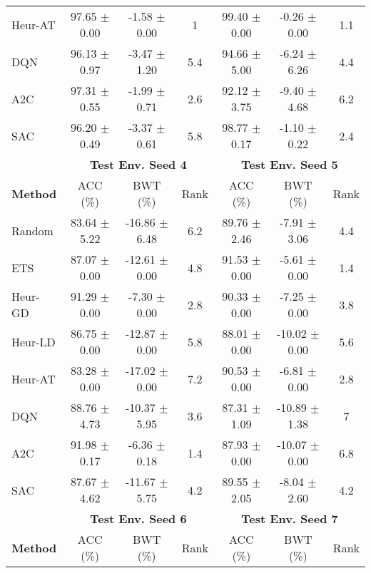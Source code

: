 \begin{tabular}{lcccccc}
	Heur-AT         & 97.65 $\pm$ 0.00   & -1.58 $\pm$ 0.00    & 1      & 99.40 $\pm$ 0.00   & -0.26 $\pm$ 0.00    & 1.1    \\
	DQN             & 96.13 $\pm$ 0.97   & -3.47 $\pm$ 1.20    & 5.4    & 94.66 $\pm$ 5.00   & -6.24 $\pm$ 6.26    & 4.4    \\
	A2C             & 97.31 $\pm$ 0.55   & -1.99 $\pm$ 0.71    & 2.6    & 92.12 $\pm$ 3.75   & -9.40 $\pm$ 4.68    & 6.2    \\
	SAC             & 96.20 $\pm$ 0.49   & -3.37 $\pm$ 0.61    & 5.8    & 98.77 $\pm$ 0.17   & -1.10 $\pm$ 0.22    & 2.4    \\
	\midrule 
	& \multicolumn{3}{c}{\textbf{Test Env. Seed 4}} & \multicolumn{3}{c}{\textbf{Test Env. Seed 5}} \\
	\cmidrule(lr){2-4} \cmidrule(lr){5-7}
	\textbf{Method} & ACC (\%)         & BWT (\%)          & Rank   & ACC (\%)         & BWT (\%)          & Rank   \\
	\midrule 
	Random          & 83.64 $\pm$ 5.22   & -16.86 $\pm$ 6.48   & 6.2    & 89.76 $\pm$ 2.46   & -7.91 $\pm$ 3.06    & 4.4    \\
	ETS             & 87.07 $\pm$ 0.00   & -12.61 $\pm$ 0.00   & 4.8    & 91.53 $\pm$ 0.00   & -5.61 $\pm$ 0.00    & 1.4    \\
	Heur-GD         & 91.29 $\pm$ 0.00   & -7.30 $\pm$ 0.00    & 2.8    & 90.33 $\pm$ 0.00   & -7.25 $\pm$ 0.00    & 3.8    \\
	Heur-LD         & 86.75 $\pm$ 0.00   & -12.87 $\pm$ 0.00   & 5.8    & 88.01 $\pm$ 0.00   & -10.02 $\pm$ 0.00   & 5.6    \\
	Heur-AT         & 83.28 $\pm$ 0.00   & -17.02 $\pm$ 0.00   & 7.2    & 90.53 $\pm$ 0.00   & -6.81 $\pm$ 0.00    & 2.8    \\
	DQN             & 88.76 $\pm$ 4.73   & -10.37 $\pm$ 5.95   & 3.6    & 87.31 $\pm$ 1.09   & -10.89 $\pm$ 1.38   & 7      \\
	A2C             & 91.98 $\pm$ 0.17   & -6.36 $\pm$ 0.18    & 1.4    & 87.93 $\pm$ 0.00   & -10.07 $\pm$ 0.00   & 6.8    \\
	SAC             & 87.67 $\pm$ 4.62   & -11.67 $\pm$ 5.75   & 4.2    & 89.55 $\pm$ 2.05   & -8.04 $\pm$ 2.60    & 4.2    \\
	\midrule 
	& \multicolumn{3}{c}{\textbf{Test Env. Seed 6}} & \multicolumn{3}{c}{\textbf{Test Env. Seed 7}} \\
	\cmidrule(lr){2-4} \cmidrule(lr){5-7}
	\textbf{Method} & ACC (\%)         & BWT (\%)          & Rank   & ACC (\%)         & BWT (\%)          & Rank   \\

\end{tabular}

